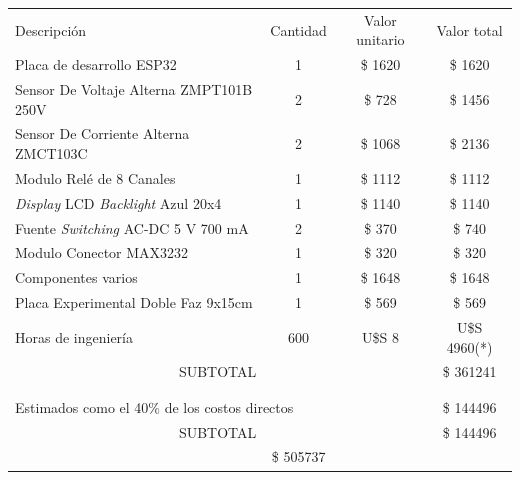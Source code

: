 \documentclass[11pt]{charter}
\begin{document}
\begin{table}[htpb]
\centering
\begin{tabularx}{\linewidth}{@{}|X|c|r|r|@{}}
\hline
\rowcolor[HTML]{C0C0C0} 
\multicolumn{4}{|c|}{\cellcolor[HTML]{C0C0C0}COSTOS DIRECTOS} \\ \hline
\rowcolor[HTML]{C0C0C0} 
Descripción &
  \multicolumn{1}{c|}{\cellcolor[HTML]{C0C0C0}Cantidad} &
  \multicolumn{1}{c|}{\cellcolor[HTML]{C0C0C0}Valor unitario} &
  \multicolumn{1}{c|}{\cellcolor[HTML]{C0C0C0}Valor total} \\ \hline
Placa de desarrollo ESP32 & \multicolumn{1}{c|}{1} & \multicolumn{1}{c|}{\$ 1620} & \multicolumn{1}{c|}{\$ 1620} \\ \hline
Sensor De Voltaje Alterna ZMPT101B 250V & \multicolumn{1}{c|}{2} & \multicolumn{1}{c|}{\$ 728} & \multicolumn{1}{c|}{\$ 1456} \\ \hline
Sensor De Corriente Alterna ZMCT103C & \multicolumn{1}{c|}{2} & \multicolumn{1}{c|}{\$ 1068} & \multicolumn{1}{c|}{\$ 2136} \\ \hline
Modulo Relé de 8 Canales & \multicolumn{1}{c|}{1} & \multicolumn{1}{c|}{\$ 1112} & \multicolumn{1}{c|}{\$ 1112} \\ \hline
\textit{Display} LCD \textit{Backlight} Azul 20x4 & \multicolumn{1}{c|}{1} & \multicolumn{1}{c|}{\$ 1140} & \multicolumn{1}{c|}{\$ 1140} \\ \hline
Fuente \textit{Switching} AC-DC 5 V 700 mA & \multicolumn{1}{c|}{2} & \multicolumn{1}{c|}{\$ 370} & \multicolumn{1}{c|}{\$ 740} \\ \hline
Modulo Conector MAX3232 & \multicolumn{1}{c|}{1} & \multicolumn{1}{c|}{\$ 320} & \multicolumn{1}{c|}{\$ 320} \\ \hline
Componentes varios & \multicolumn{1}{c|}{1} & \multicolumn{1}{c|}{\$ 1648} & \multicolumn{1}{c|}{\$ 1648} \\ \hline
Placa Experimental Doble Faz 9x15cm & \multicolumn{1}{c|}{1} & \multicolumn{1}{c|}{\$ 569} & \multicolumn{1}{c|}{\$ 569} \\ \hline
Horas de ingeniería & \multicolumn{1}{c|}{600} & \multicolumn{1}{c|}{U\$S 8} & \multicolumn{1}{c|}{U\$S 4960(*)} \\ \hline
\multicolumn{3}{|c|}{SUBTOTAL} &
  \multicolumn{1}{c|}{\$ 361241} \\ \hline
\rowcolor[HTML]{C0C0C0} 
\multicolumn{4}{|c|}{\cellcolor[HTML]{C0C0C0}COSTOS INDIRECTOS} \\ \hline 
\rowcolor[HTML]{C0C0C0} 
\multicolumn{3}{|l|}{Descripción} & \\ \hline
\multicolumn{3}{|l|}{Estimados como el 40\% de los costos directos} & \multicolumn{1}{c|}{\$ 144496} \\ \hline
\multicolumn{3}{|c|}{SUBTOTAL} &
  \multicolumn{1}{c|}{\$ 144496} \\ \hline
\rowcolor[HTML]{C0C0C0}
\multicolumn{3}{|c|}{TOTAL} & \multicolumn{1}{c|}{\$ 505737}
   \\ \hline
\end{tabularx}%
\end{table}
\end{document}
